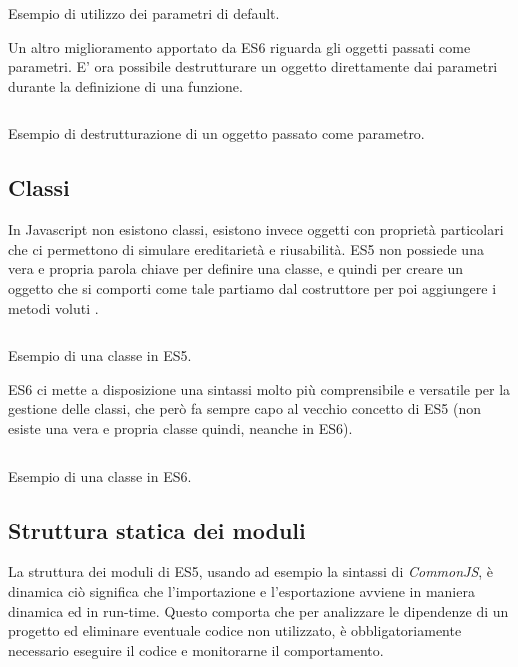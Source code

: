 \begin{listing}[ht]
\inputminted{Javascript}{sources/exampleDefaultParametersES6.js}
\caption{Esempio di utilizzo dei parametri di default.}
\end{listing}

\noindent
Un altro miglioramento apportato da ES6 riguarda gli oggetti passati come parametri. E' ora possibile destrutturare un oggetto direttamente dai parametri durante la definizione di una funzione.

\begin{listing}[ht]
\inputminted{Javascript}{sources/exampleObjectParameterES6.js}
\caption{Esempio di destrutturazione di un oggetto passato come parametro.}
\end{listing}

\subsection{Classi}
In Javascript non esistono classi, esistono invece oggetti con proprietà particolari che ci permettono di simulare ereditarietà e riusabilità. ES5 non possiede una vera e propria parola chiave per definire una classe, e quindi per creare un oggetto che si comporti come tale partiamo dal costruttore per poi aggiungere i metodi voluti \cite{RylanOnPrototypeInheritance}.

\begin{listing}[ht]
\inputminted{Javascript}{sources/examplePrototypeInheritanceES5.js}
\caption{Esempio di una classe in ES5.}
\end{listing}

\noindent
ES6 ci mette a disposizione una sintassi molto più comprensibile e versatile per la gestione delle classi, che però fa sempre capo al vecchio concetto di ES5 (non esiste una vera e propria classe quindi, neanche in ES6). 

\begin{listing}[ht]
\inputminted{Javascript}{sources/exampleClassES6.js}
\caption{Esempio di una classe in ES6.}
\end{listing}

\subsection{Struttura statica dei moduli}
La struttura dei moduli di ES5, usando ad esempio la sintassi di \textit{CommonJS}\footnotemark, è dinamica ciò significa che l'importazione e l'esportazione avviene in maniera dinamica ed in run-time. Questo comporta che per analizzare le dipendenze di un progetto ed eliminare eventuale codice non utilizzato, è obbligatoriamente necessario eseguire il codice e monitorarne il comportamento.

